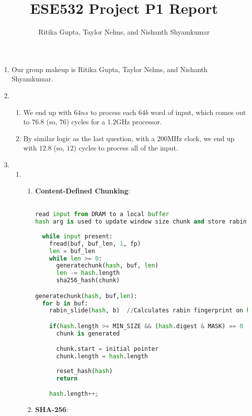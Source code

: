 \documentclass{article}
\title{ESE532 Project P1 Report}
\author{Ritika Gupta, Taylor Nelms, and Nishanth Shyamkumar}
\begin{document}
\maketitle


\begin{enumerate}
\item%
Our group makeup is Ritika Gupta, Taylor Nelms, and Nishanth Shyamkumar.

\item%
\begin{enumerate}[label=(\alph*)]
\item%
We end up with $64ns$ to process each $64b$ word of input, which comes out to $76.8$ (so, $76$) cycles for a $1.2$GHz processor.

\item%
By similar logic as the last question, with a $200$MHz clock, we end up with $12.8$ (so, $12$) cycles to process all of the input.

\end{enumerate}%

\item%
\begin{enumerate}[label=(\alph*)]
\item%
\begin{enumerate}[label=(\roman*)]
\item%
\textbf{Content-Defined Chunking}:
\begin{lstlisting}[language=python]

read input from DRAM to a local buffer
hash arg is used to update window size chunk and store rabin fingerprint
  
  while input present:
    fread(buf, buf_len, 1, fp)
    len = buf_len
    while len >= 0:
      generatechunk(hash, buf, len)
      len -= hash.length
      sha256_hash(chunk)

generatechunk(hash, buf,len):
  for b in buf:
    rabin_slide(hash, b)  //Calculates rabin fingerprint on hash.window. 

    if(hash.length >= MIN_SIZE && (hash.digest & MASK) == 0 || hash.length >= MAX_SIZE) //MASK is a bitmask which detects 0 on LSB 20 bits.
      chunk is generated

      chunk.start = initial pointer
      chunk.length = hash.length
    
      reset_hash(hash)
      return

    hash.length++;  

\end{lstlisting}
\item%
\textbf{SHA-256}:
\begin{lstlisting}[language=python]


\end{lstlisting}
\end{enumerate}
\end{enumerate}
\end{enumerate}
\end{document}
